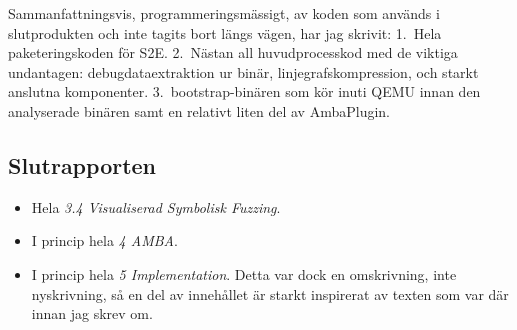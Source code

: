Sammanfattningsvis, programmeringsmässigt, av koden som används i slutprodukten och inte tagits bort
längs vägen, har jag skrivit: 1.\ Hela paketeringskoden för S2E. 2.\ Nästan all huvudprocesskod med de
viktiga undantagen: debugdataextraktion ur binär, linjegrafskompression, och starkt anslutna
komponenter. 3.\ bootstrap-binären som kör inuti QEMU innan den analyserade binären samt en relativt
liten del av AmbaPlugin.

\subsection*{Slutrapporten}

\begin{itemize}

	\item Hela \textit{3.4 Visualiserad Symbolisk Fuzzing}.

	\item I princip hela \textit{4 AMBA}.

	\item I princip hela \textit{5 Implementation}. Detta var dock en omskrivning, inte nyskrivning,
	      så en del av innehållet är starkt inspirerat av texten som var där innan jag skrev om.

\end{itemize}
